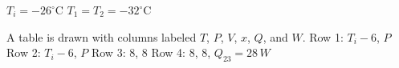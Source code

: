 \( T_i = -26^\circ \text{C} \)  
\( T_1 = T_2 = -32^\circ \text{C} \)  

A table is drawn with columns labeled \( T \), \( P \), \( V \), \( x \), \( Q \), and \( W \).  
Row 1: \( T_i - 6 \), \( P \)  
Row 2: \( T_i - 6 \), \( P \)  
Row 3: \( 8 \), \( 8 \)  
Row 4: \( 8 \), \( 8 \), \( Q_{23} = 28 \, W \)